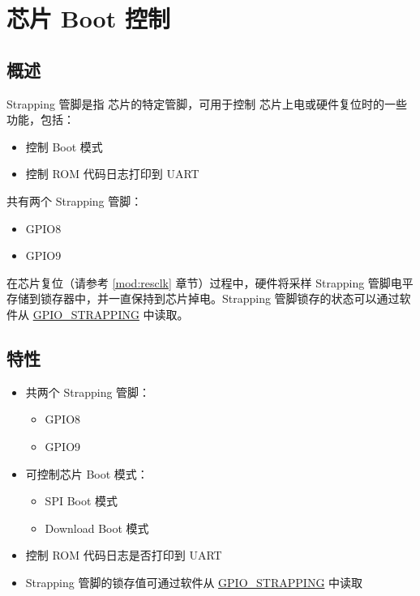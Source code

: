 \documentclass[main\_\_CN.tex]{subfiles}
\begin{document}

\ifglobal
\else
    {\let\clearpage\relax \listoftodos}
    \tableofcontents
\fi



\hypertarget{bootctrl}{}
\chapter{芯片 Boot 控制}
\label{mod:bootctrl}


\section{概述}

Strapping 管脚是指 \chipname{} 芯片的特定管脚，可用于控制 \chipname{} 芯片上电或硬件复位时的一些功能，包括：
\begin{itemize}
    \item 控制 Boot 模式
    \item 控制 ROM 代码日志打印到 UART
\end{itemize}

\chipname{} 共有两个 Strapping 管脚：
\begin{itemize}
    \item GPIO8
    \item GPIO9
\end{itemize}

在芯片复位（请参考 \ref{mod:resclk} \textit{} 章节）过程中，硬件将采样 Strapping 管脚电平存储到锁存器中，并一直保持到芯片掉电。Strapping 管脚锁存的状态可以通过软件从 \hyperref[fielddesc:GPIOSTRAPPING]{GPIO\_STRAPPING} 中读取。



\section{特性}
\begin{itemize}
    \item 共两个 Strapping 管脚：
    \begin{itemize}
        \item GPIO8
        \item GPIO9
    \end{itemize}
    \item 可控制芯片 Boot 模式：
    \begin{itemize}
        \item SPI Boot 模式
        \item Download Boot 模式
    \end{itemize}
    \item 控制 ROM 代码日志是否打印到 UART
    \item Strapping 管脚的锁存值可通过软件从 \hyperref[fielddesc:GPIOSTRAPPING]{GPIO\_STRAPPING} 中读取
\end{itemize}
\end{document}

